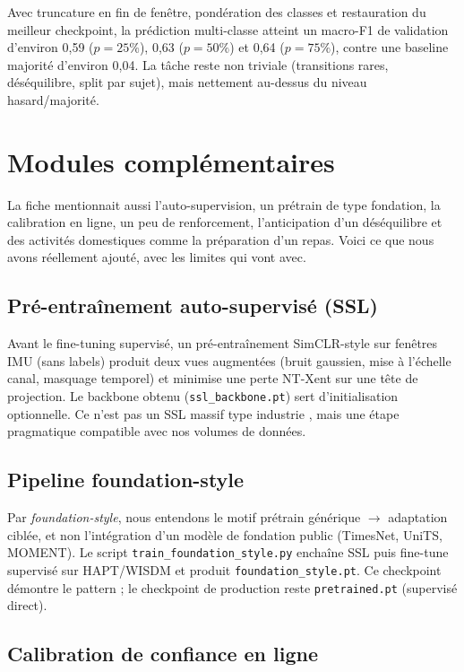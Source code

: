 Avec truncature en fin de fenêtre, pondération des classes et restauration
du meilleur checkpoint, la prédiction multi-classe atteint un macro-F1 de
validation d'environ 0,59 ($p=25\%$), 0,63 ($p=50\%$) et 0,64 ($p=75\%$),
contre une baseline majorité d'environ 0,04. La tâche reste non triviale
(transitions rares, déséquilibre, split par sujet), mais nettement au-dessus
du niveau hasard/majorité.

\section{Modules complémentaires}

La fiche mentionnait aussi l'auto-supervision, un prétrain de type fondation,
la calibration en ligne, un peu de renforcement, l'anticipation d'un déséquilibre
et des activités domestiques comme la préparation d'un repas. Voici ce que
nous avons réellement ajouté, avec les limites qui vont avec.

\subsection{Pré-entraînement auto-supervisé (SSL)}

Avant le fine-tuning supervisé, un pré-entraînement SimCLR-style sur fenêtres
IMU (sans labels) produit deux vues augmentées (bruit gaussien, mise à
l'échelle canal, masquage temporel) et minimise une perte NT-Xent sur une
tête de projection. Le backbone obtenu (\texttt{ssl\_backbone.pt}) sert
d'initialisation optionnelle. Ce n'est pas un SSL massif type industrie
\parencite{yuan2024}, mais une étape pragmatique compatible avec nos volumes
de données.

\subsection{Pipeline foundation-style}

Par \emph{foundation-style}, nous entendons le motif
prétrain générique $\rightarrow$ adaptation ciblée, et non l'intégration d'un
modèle de fondation public (TimesNet, UniTS, MOMENT). Le script
\texttt{train\_foundation\_style.py} enchaîne SSL puis fine-tune supervisé
sur HAPT/WISDM et produit \texttt{foundation\_style.pt}. Ce checkpoint
démontre le pattern ; le checkpoint de production reste
\texttt{pretrained.pt} (supervisé direct).

\subsection{Calibration de confiance en ligne}

